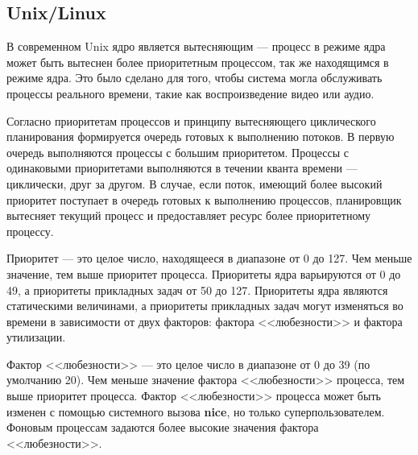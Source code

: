 \documentclass[a4paper,14pt]{extarticle}
\begin{document}
\subsection{Unix/Linux}


В современном Unix ядро является вытесняющим --- процесс в режиме ядра может быть вытеснен более приоритетным процессом, так же находящимся в режиме ядра. Это было сделано  для того, чтобы система могла обслуживать процессы реального времени, такие как воспроизведение видео или аудио.

Согласно приоритетам процессов и принципу вытесняющего циклического планирования формируется очередь готовых к выполнению потоков. В 
первую очередь выполняются процессы с большим приоритетом. Процессы с одинаковыми приоритетами выполняются в течении кванта времени --- 
циклически, друг за другом. В случае, если поток, имеющий более высокий приоритет поступает в очередь готовых к выполнению процессов, 
планировщик вытесняет текущий процесс и предоставляет ресурс более приоритетному процессу.

Приоритет --- это целое число, находящееся в диапазоне от 0 до 127. Чем меньше значение, тем выше приоритет процесса. Приоритеты ядра 
варьируются от 0 до 49, а приоритеты прикладных задач от 50 до 127. Приоритеты ядра являются статическими величинами, а приоритеты 
прикладных задач могут изменяться во времени в зависимости от двух факторов: фактора <<любезности>> и фактора утилизации.

Фактор <<любезности>> --- это целое число в диапазоне от 0 до 39 (по умолчанию 20). Чем меньше значение фактора <<любезности>> процесса, 
тем выше приоритет процесса. Фактор <<любезности>> процесса может быть изменен с помощью системного вызова \textbf{nice}, но только 
суперпользователем. Фоновым процессам задаются более высокие значения фактора <<любезности>>.
\end{document}
